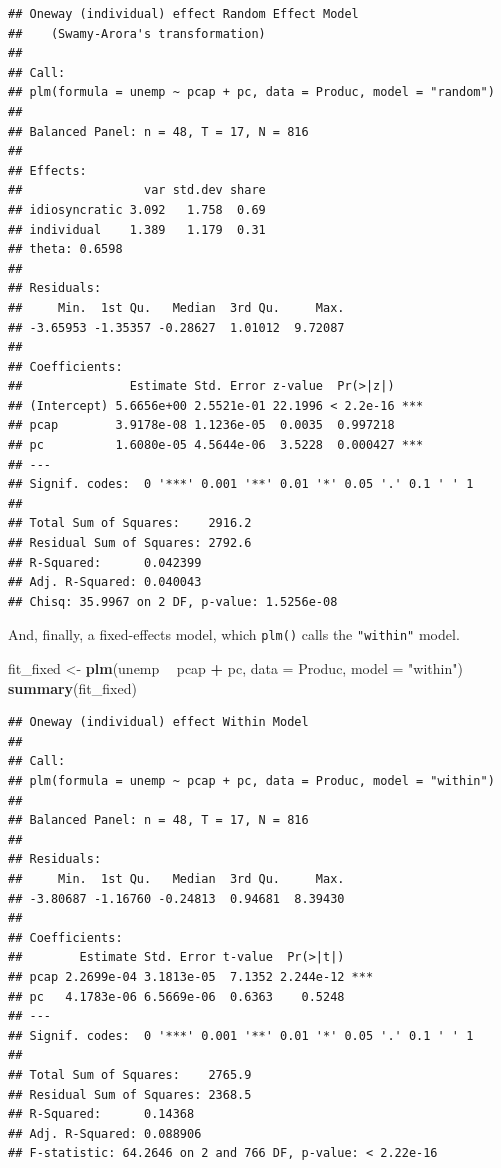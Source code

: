 \documentclass[12pt,oneside,openany]{book}
\newenvironment{Shaded}{\begin{snugshade}}{\end{snugshade}}
\newcommand{\KeywordTok}[1]{\textcolor[rgb]{0.13,0.29,0.53}{\textbf{#1}}}
\newcommand{\DataTypeTok}[1]{\textcolor[rgb]{0.13,0.29,0.53}{#1}}
\newcommand{\StringTok}[1]{\textcolor[rgb]{0.31,0.60,0.02}{#1}}
\newcommand{\OperatorTok}[1]{\textcolor[rgb]{0.81,0.36,0.00}{\textbf{#1}}}
\newcommand{\NormalTok}[1]{#1}
\begin{document}
\begin{verbatim}
## Oneway (individual) effect Random Effect Model 
##    (Swamy-Arora's transformation)
## 
## Call:
## plm(formula = unemp ~ pcap + pc, data = Produc, model = "random")
## 
## Balanced Panel: n = 48, T = 17, N = 816
## 
## Effects:
##                 var std.dev share
## idiosyncratic 3.092   1.758  0.69
## individual    1.389   1.179  0.31
## theta: 0.6598
## 
## Residuals:
##     Min.  1st Qu.   Median  3rd Qu.     Max. 
## -3.65953 -1.35357 -0.28627  1.01012  9.72087 
## 
## Coefficients:
##               Estimate Std. Error z-value  Pr(>|z|)    
## (Intercept) 5.6656e+00 2.5521e-01 22.1996 < 2.2e-16 ***
## pcap        3.9178e-08 1.1236e-05  0.0035  0.997218    
## pc          1.6080e-05 4.5644e-06  3.5228  0.000427 ***
## ---
## Signif. codes:  0 '***' 0.001 '**' 0.01 '*' 0.05 '.' 0.1 ' ' 1
## 
## Total Sum of Squares:    2916.2
## Residual Sum of Squares: 2792.6
## R-Squared:      0.042399
## Adj. R-Squared: 0.040043
## Chisq: 35.9967 on 2 DF, p-value: 1.5256e-08
\end{verbatim}

And, finally, a fixed-effects model, which \texttt{plm()} calls the
\texttt{"within"} model.

\begin{Shaded}
\begin{Highlighting}[]
\NormalTok{fit_fixed <-}\StringTok{ }\KeywordTok{plm}\NormalTok{(unemp }\OperatorTok{~}\StringTok{ }\NormalTok{pcap }\OperatorTok{+}\StringTok{ }\NormalTok{pc,}
                 \DataTypeTok{data =}\NormalTok{ Produc,}
                 \DataTypeTok{model =} \StringTok{"within"}\NormalTok{)}
\KeywordTok{summary}\NormalTok{(fit_fixed)}
\end{Highlighting}
\end{Shaded}

\begin{verbatim}
## Oneway (individual) effect Within Model
## 
## Call:
## plm(formula = unemp ~ pcap + pc, data = Produc, model = "within")
## 
## Balanced Panel: n = 48, T = 17, N = 816
## 
## Residuals:
##     Min.  1st Qu.   Median  3rd Qu.     Max. 
## -3.80687 -1.16760 -0.24813  0.94681  8.39430 
## 
## Coefficients:
##        Estimate Std. Error t-value  Pr(>|t|)    
## pcap 2.2699e-04 3.1813e-05  7.1352 2.244e-12 ***
## pc   4.1783e-06 6.5669e-06  0.6363    0.5248    
## ---
## Signif. codes:  0 '***' 0.001 '**' 0.01 '*' 0.05 '.' 0.1 ' ' 1
## 
## Total Sum of Squares:    2765.9
## Residual Sum of Squares: 2368.5
## R-Squared:      0.14368
## Adj. R-Squared: 0.088906
## F-statistic: 64.2646 on 2 and 766 DF, p-value: < 2.22e-16
\end{verbatim}
\end{document}
